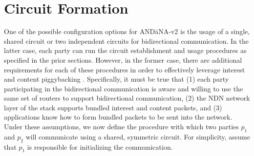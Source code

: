 \documentclass[10pt]{article}
\begin{document}


\section{Circuit Formation}
One of the possible configuration options for {\sf AND\=aNA-v2} is the usage of a single, shared circuit or two independent circuits for bidirectional communication. In the latter case, each party can run the circuit establishment and usage procedures as specified in the prior sections. However, in the former case, there are additional requirements for each of these procedures in order to effectively leverage interest and content piggybacking \cite{piggyback}. Specifically, it must be true that (1) each party participating in the bidirectional communication is aware and willing to use the same set of routers to support bidirectional communication, (2) the NDN network layer of the stack supports bundled interest and content packets, and (3) applications know how to form bundled packets to be sent into the network. Under these assumptions, we now define the procedure with which two parties $p_1$ and $p_2$ will communicate using a shared, symmetric circuit. For simplicity, assume that $p_1$ is responsible for initializing the communication. 
\end{document}
